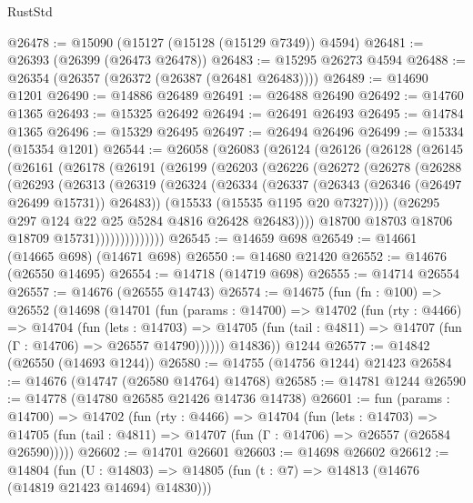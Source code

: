 \begin{lexlean}{RustStd}
\begin{coremodule}
@26478 := @15090 (@15127 (@15128 (@15129 @7349)) @4594)
@26481 := @26393 (@26399 (@26473 @26478))
@26483 := @15295 @26273 @4594
@26488 := @26354 (@26357 (@26372 (@26387 (@26481 @26483))))
@26489 := @14690 @1201
@26490 := @14886 @26489
@26491 := @26488 @26490
@26492 := @14760 @1365
@26493 := @15325 @26492
@26494 := @26491 @26493
@26495 := @14784 @1365
@26496 := @15329 @26495
@26497 := @26494 @26496
@26499 := @15334 (@15354 @1201)
@26544 := @26058
    (@26083
      (@26124
        (@26126
          (@26128
            (@26145
              (@26161
                (@26178
                  (@26191
                    (@26199
                      (@26203
                        (@26226
                          (@26272
                            (@26278
                              (@26288
                                (@26293
                                  (@26313
                                    (@26319
                                      (@26324
                                        (@26334
                                          (@26337 (@26343 (@26346 (@26497 @26499 @15731)) @26483))
                                          (@15533 (@15535 @1195 @20 @7327))))
                                      (@26295 @297 @124 @22 @25 @5284 @4816 @26428 @26483))))
                                @18700
                                @18703
                                @18706
                                @18709
                                @15731))))))))))))))
@26545 := @14659 @698
@26549 := @14661 (@14665 @698) (@14671 @698)
@26550 := @14680 @21420
@26552 := @14676 (@26550 @14695)
@26554 := @14718 (@14719 @698)
@26555 := @14714 @26554
@26557 := @14676 (@26555 @14743)
@26574 := @14675
    (fun (fn : @100) =>
    @26552
      (@14698
        (@14701
          (fun (params : @14700) =>
          @14702
            (fun (rty : @4466) =>
            @14704
              (fun (lets : @14703) =>
              @14705 (fun (tail : @4811) => @14707 (fun (Γ : @14706) => @26557 @14790))))))
        @14836))
    @1244
@26577 := @14842 (@26550 (@14693 @1244))
@26580 := @14755 (@14756 @1244) @21423
@26584 := @14676 (@14747 (@26580 @14764) @14768)
@26585 := @14781 @1244
@26590 := @14778 (@14780 @26585 @21426 @14736 @14738)
@26601 := fun (params : @14700) =>
  @14702
    (fun (rty : @4466) =>
    @14704
      (fun (lets : @14703) =>
      @14705 (fun (tail : @4811) => @14707 (fun (Γ : @14706) => @26557 (@26584 @26590)))))
@26602 := @14701 @26601
@26603 := @14698 @26602
@26612 := @14804
    (fun (U : @14803) => @14805 (fun (t : @7) => @14813 (@14676 (@14819 @21423 @14694) @14830)))

\end{coremodule}
\end{lexlean}
